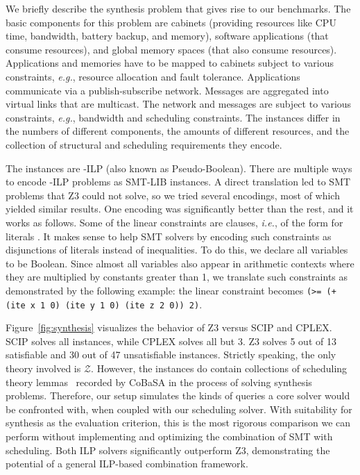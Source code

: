 \documentclass{llncs}
\newcommand{\cobasa}[0]{\textsf{CoBaSA}}
\newcommand{\ie}[0]{\emph{i.e.}, }
\newcommand{\eg}[0]{\emph{e.g.}, }
\newcommand{\Z}[0]{\ensuremath{\mathcal{Z}}}
\begin{document}
We briefly describe the synthesis problem that gives rise to our
benchmarks. The basic components for this problem are cabinets
(providing resources like CPU time, bandwidth, battery backup,
and memory), software applications (that consume resources), and
global memory spaces (that also consume resources). Applications
and memories have to be mapped to cabinets subject to various
constraints, \eg resource allocation and fault
tolerance. Applications communicate via a publish-subscribe
network. Messages are aggregated into virtual links that are
multicast. The network and messages are subject to various
constraints, \eg bandwidth and scheduling constraints.  The
instances differ in the numbers of different components, the
amounts of different resources, and the collection of structural
and scheduling requirements they encode.

The instances are -ILP (also known as Pseudo-Boolean). There
are multiple ways to encode -ILP problems as SMT-LIB
instances. A direct translation led to SMT problems that Z3 could not
solve, so we tried several encodings, most of which yielded similar
results. One encoding was significantly better than the rest, and it
works as follows. Some of the linear constraints are clauses, \ie of
the form  for literals . It makes sense to help
SMT solvers by encoding such constraints as disjunctions of literals
instead of inequalities. To do this, we declare all variables to be
Boolean. Since almost all variables also appear in arithmetic contexts
where they are multiplied by constants greater than 1, we translate
such constraints as demonstrated by the following example: the linear
constraint  becomes \texttt{(>= (+ (ite x 1 0)
  (ite y 1 0) (ite z 2 0)) 2)}.



Figure~\ref{fig:synthesis} visualizes the behavior of Z3 versus SCIP
and CPLEX. SCIP solves all instances, while CPLEX solves all but 3. Z3
solves 5 out of 13 satisfiable and 30 out of 47 unsatisfiable
instances. Strictly speaking, the only theory involved is
\Z{}. However, the instances do contain collections of scheduling
theory lemmas~\cite{hmp11} recorded by \cobasa{} in the process of
solving synthesis problems.  Therefore, our setup simulates the kinds
of queries a core solver would be confronted with, when coupled with
our scheduling solver. With suitability for synthesis as the
evaluation criterion, this is the most rigorous comparison we can
perform without implementing and optimizing the combination of SMT
with scheduling. Both ILP solvers significantly outperform Z3,
demonstrating the potential of a general ILP-based combination
framework.
\end{document}
